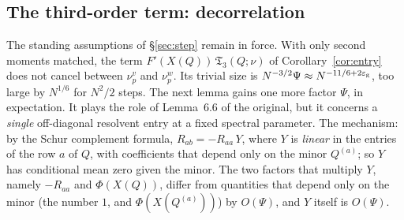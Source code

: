 \subsection{The third-order term: decorrelation}\label{sec:decor}
The standing assumptions of \S\ref{sec:step} remain in force. With only second moments matched, the term $F'(X(Q))\,\mathfrak T_3(Q;\nu)$ of Corollary~\ref{cor:entry} does not
cancel between $\nu^v_p$ and $\nu^w_p$. Its trivial size is $N^{-3/2}\Psi\approx N^{-11/6+2\varepsilon_{\mathrm g}}$, too large by $N^{1/6}$ for $N^2/2$ steps. The next lemma gains one more
factor $\Psi$, in expectation. It plays the role of Lemma~6.6 of the original, but it concerns a \emph{single} off-diagonal resolvent entry at a fixed spectral parameter.
The mechanism: by the Schur complement formula, $R_{ab}=-R_{aa}\,Y$, where $Y$ is \emph{linear} in the entries of the row $a$ of $Q$, with coefficients that depend only
on the minor $Q^{(a)}$; so $Y$ has conditional mean zero given the minor. The two factors that multiply $Y$, namely $-R_{aa}$ and $\Phi(X(Q))$, differ from quantities
that depend only on the minor (the number $1$, and $\Phi(X(Q^{(a)}))$) by $O(\Psi)$, and $Y$ itself is $O(\Psi)$.

